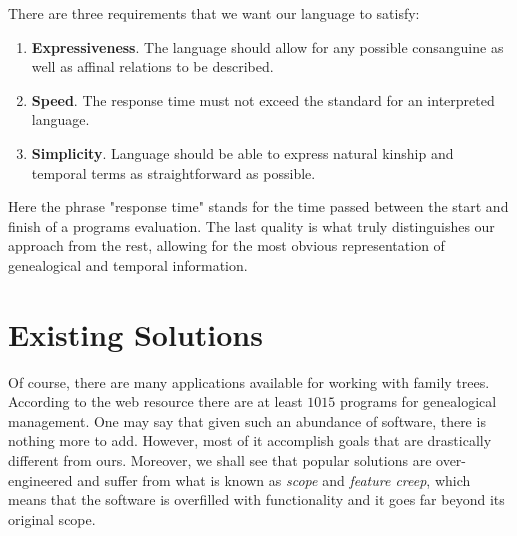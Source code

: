    There are three requirements that we want our language to satisfy:
    \begin{enumerate}
        \item{\textbf{Expressiveness}. The language should allow for any possible consanguine as well as affinal relations to be
            described.}
        \item{\textbf{Speed}. The response time must not exceed the standard for an interpreted language.}
        \item{\textbf{Simplicity}. Language should be able to express natural kinship and temporal terms as straightforward as possible.}
    \end{enumerate}
    Here the phrase "response time" stands for the time passed between the start and finish of a programs evaluation.
    The last quality is what truly distinguishes our approach from the rest, allowing for the most obvious representation of
    genealogical and temporal information.

\section{Existing Solutions}
    Of course, there are many applications available for working with family trees. According to the web resource\cite{gensoft} there
    are at least $1015$ programs for genealogical management. One may say that given such an abundance of software, there is
    nothing more to add. However, most of it accomplish goals that are drastically different from ours. Moreover, we shall see that
    popular solutions are over-engineered and suffer from what is known as \textit{scope} and \textit{feature creep}, which means
    that the software is overfilled with functionality and it goes far beyond its original scope.

